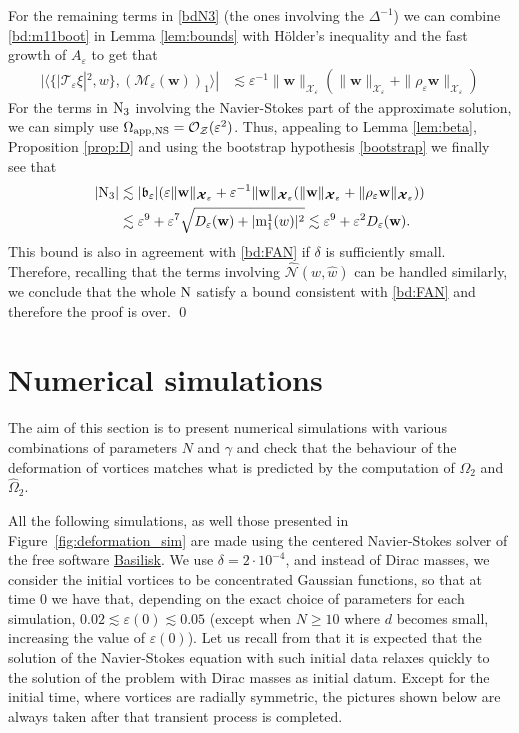 \documentclass[11pt,reqno,a4paper]{amsart}
\def\eps{\varepsilon}
\newcommand{\cM}{\mathcal{M}}
\newcommand{\cN}{\mathcal{N}}
\newcommand{\cO}{\mathcal{O}}
\newcommand{\cT}{\mathcal{T}}
\newcommand{\cX}{\mathcal{X}}
\newcommand{\cZ}{\mathcal{Z}}
\newcommand{\mrm}{\mathrm{m}}
\newcommand{\1}{\mathbbm{1}}
\theoremstyle{definition}
\theoremstyle{definition}
\numberwithin{equation}{section}
\begin{document}
For the remaining terms in \cref{bdN3} (the ones involving the $\Delta^{-1}$) we can combine \cref{bd:m11boot} in Lemma \ref{lem:bounds} with H\"older's inequality and the fast growth of $A_\eps$ to get that 
\begin{align}
     |\langle \{|\cT_{\eps}\xi|^2,w\},(\cM_\eps(\mathbf{w}))_1\rangle|&\lesssim \eps^{-1} \|\mathbf{w}\|_{\cX_\eps}(\|\mathbf{w}\|_{\cX_\eps}+\|\rho_\eps\mathbf{w}\|_{\cX_\eps})
\end{align}
For the terms in ${\rm N}_3$ involving the Navier-Stokes part of the approximate solution, we can simply use $\Omega_{\rm app,NS}=\cO_\cZ(\eps^2)$. Thus, appealing to Lemma \ref{lem:beta}, Proposition \ref{prop:D} and using the bootstrap hypothesis \cref{bootstrap} we finally see that
\begin{align}
    |{\rm N}_3|&\lesssim |\mathfrak{b}_\eps|(\eps \|{\mathbf w}\|_{\boldsymbol{\cX}_\eps}+\eps^{-1}\|{\mathbf w}\|_{\boldsymbol{\cX}_\eps}(\|{\mathbf w}\|_{\boldsymbol{\cX}_\eps}+\|\rho_\eps{\mathbf w}\|_{\boldsymbol{\cX}_\eps}))\\
    &\lesssim \eps^9+\eps^7\sqrt{D_{\eps}({\mathbf w})+|\mrm^1_1(w)|^2}\lesssim \eps^9+\eps^2D_{\eps}({\mathbf w}).
\end{align}
This bound is also in agreement with \cref{bd:FAN} if  $\delta$ is sufficiently small. Therefore, recalling that the terms involving $\widehat{\cN}(w,\widehat{w})$ can be handled similarly, we conclude that the whole ${\rm N}$ satisfy a bound consistent with \cref{bd:FAN} and therefore the proof is over. \qed





\section{Numerical simulations}\label{sec:sim}

The aim of this section is to present numerical simulations with various combinations of parameters $N$ and $\gamma$ and check that the behaviour of the deformation of vortices matches what is predicted by the computation of $\Omega_2$ and $\widehat{\Omega}_2$. 

All the following simulations, as well those presented in Figure~\ref{fig:deformation_sim} are made using the centered Navier-Stokes solver of the free software \href{http://basilisk.fr/}{Basilisk}. We use $\delta = 2\cdot 10^{-4}$, and instead of Dirac masses, we consider the initial vortices to be concentrated Gaussian functions, so that at time 0 we have that, depending on the exact choice of parameters for each simulation, $0.02 \lesssim \eps(0) \lesssim 0.05$ (except when $N \ge 10$ where $d$ becomes small, increasing the value of $\eps(0)$). 
Let us recall from \cite{donati2025fast} that it is expected that the solution of the Navier-Stokes equation with such initial data relaxes quickly to the solution of the problem with Dirac masses as initial datum. Except for the initial time, where vortices are radially symmetric, the pictures shown below are always taken after that transient process is completed.
\end{document}
